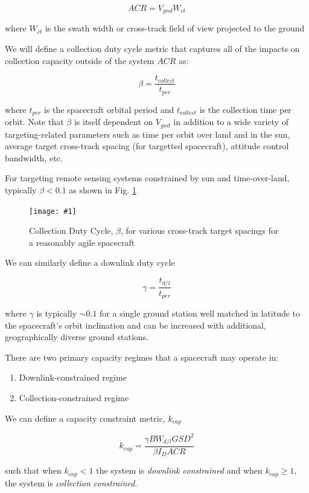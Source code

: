 \documentclass[10pt,journal]{IEEEtran}  %
\newcommand{\includefigure}[3]
{
  \begin{figure}[h!]
  \centering
  \texttt{[image: \#1]}
  \caption[]{#3}
  \label{#2}
  \end{figure}
}
\begin{document}
$$ACR = V_{gnd}W_{ct}$$

where $W_{ct}$ is the swath width or cross-track field of view projected to the ground

We will define a collection duty cycle metric that captures all of the impacts on collection capacity outside of the system $ACR$ as:

\begin{equation}
    \beta = \frac{t_{collect}}{t_{per}}
\end{equation} 

where $t_{per}$ is the spacecraft orbital period and $t_{collect}$ is the collection time per orbit.  Note that $\beta$ is itself dependent on $V_{gnd}$ in addition to a wide variety of targeting-related parameters such as time per orbit over land and in the sun, average target cross-track spacing (for targetted spacecraft), attitude control bandwidth, etc.

For targeting remote sensing systems constrained by sun and time-over-land, typically $\beta < 0.1$ as shown in Fig. \ref{fig:beta}

\includefigure{figures/collection_dc.pgf}{fig:beta}{Collection Duty Cycle, $\beta$, for various cross-track target spacings for a reasonably agile spacecraft}

We can similarly define a downlink duty cycle

\begin{equation}
    \gamma = \frac{t_{d/l}}{t_{per}}
\end{equation}

where $\gamma$ is typically $\sim 0.1$ for a single ground station well matched in latitude to the spacecraft's orbit inclination and can be increased with additional, geographically diverse ground stations.

There are two primary capacity regimes that a spacecraft may operate in:

\begin{enumerate}
\item Downlink-constrained regime
\item Collection-constrained regime
\end{enumerate}

We can define a capacity constraint metric, $k_{cap}$

\begin{equation}
k_{cap} = \frac{\gamma BW_{d/l} GSD^2}{\beta I_D ACR}
\end{equation}

such that when $k_{cap} < 1$ the system is \emph{downlink constrained} and when $k_{cap} \geq 1$, the system is \emph{collection constrained}.
\end{document}

